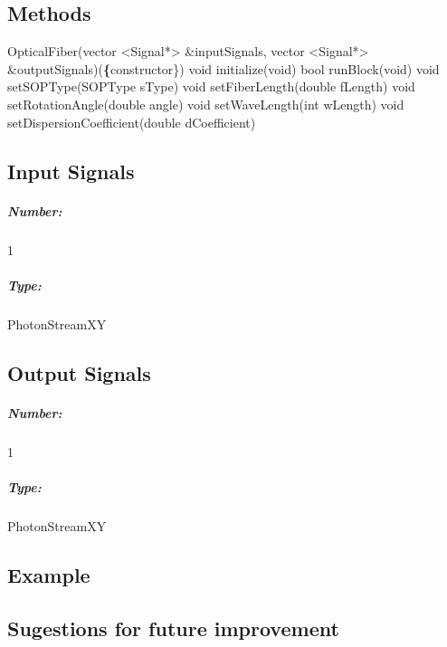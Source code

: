 \subsection*{Methods}

OpticalFiber(vector <Signal*> \&inputSignals, vector <Signal*> \&outputSignals)(\textbf\{constructor\})
\bigbreak
void initialize(void)
\bigbreak
bool runBlock(void)
\bigbreak
void setSOPType(SOPType sType)
\bigbreak
void setFiberLength(double fLength)
\bigbreak
void setRotationAngle(double angle)
\bigbreak
void setWaveLength(int wLength)
\bigbreak
void setDispersionCoefficient(double dCoefficient)

\pagebreak

\subsection*{Input Signals}

\subparagraph*{Number:} 1

\subparagraph*{Type:}PhotonStreamXY

\subsection*{Output Signals}

\subparagraph*{Number:} 1

\subparagraph*{Type:} PhotonStreamXY

\subsection*{Example}

\subsection*{Sugestions for future improvement}
